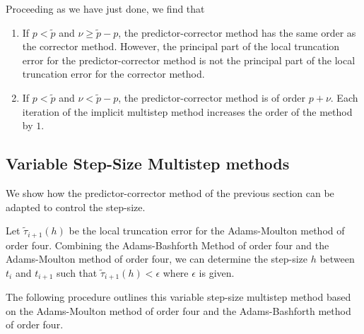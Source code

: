 Proceeding as we have just done, we find that
\begin{enumerate}
\item If $p < \tilde{p}$ and $\nu \geq \tilde{p}-p$, the
predictor-corrector method has the same order as the corrector method.
However, the principal part of the local truncation error for the
predictor-corrector method is not the principal part of the local
truncation error for the corrector method.
\item If $p < \tilde{p}$ and $\nu < \tilde{p}-p$, the
predictor-corrector method is of order $p+\nu$.  Each iteration of the
implicit multistep method increases the order of the method by $1$.
\end{enumerate}

\subsection{Variable Step-Size Multistep methods}

We show how the predictor-corrector method of the previous section can
be adapted to control the step-size.

Let $\tilde{\tau}_{i+1}(h)$ be the local truncation error for the
Adams-Moulton method of order four.  Combining the
Adams-Bashforth Method of order four and the Adams-Moulton method of
order four, we can determine the step-size $h$ between $t_i$ and $t_{i+1}$
such that $\tilde{\tau}_{i+1}(h)<\epsilon$ where $\epsilon$ is given.

The following procedure outlines this variable step-size multistep
method based on the Adams-Moulton method of order four and
the Adams-Bashforth method of order four.

